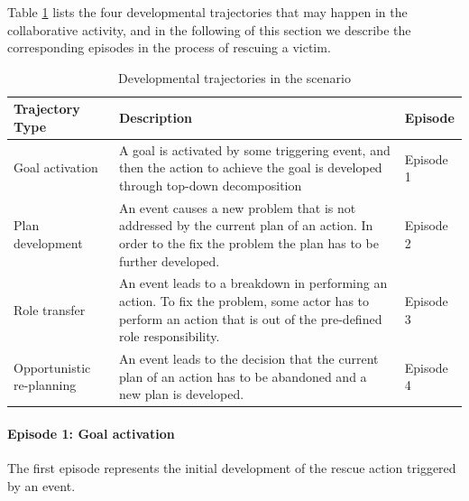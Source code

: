 Table \ref{tab:development_trajectories} lists the four developmental trajectories that may happen in the collaborative activity, and in the following of this section we describe the corresponding episodes in the process of rescuing a victim. 

\begin{table}[htbp]
\centering
\footnotesize
\begin{tabular}{>{\raggedright}p{1.4in}>{\raggedright}p{2.5in}>{\raggedright}p{1in}}

\toprule 
\textbf{Trajectory Type} & \textbf{Description} & \textbf{Episode}\tabularnewline
\midrule 
Goal activation & A goal is activated by some triggering event, and then the action
to achieve the goal is developed through top-down decomposition & Episode 1\tabularnewline
\midrule 
Plan development & An event causes a new problem that is not addressed by the current
plan of an action. In order to the fix the problem the plan has to
be further developed. & Episode 2\tabularnewline
\midrule 
Role transfer & An event leads to a breakdown in performing an action. To fix the problem, some actor has to perform an action that is out of the pre-defined role responsibility. & Episode 3\tabularnewline
\midrule 
Opportunistic re-planning & An event leads to the decision that the current plan of an action
has to be abandoned and a new plan is developed. & Episode 4\tabularnewline
\bottomrule

\end{tabular}	
\caption{Developmental trajectories in the scenario}
\label{tab:development_trajectories}
\end{table}

\paragraph*{Episode 1: Goal activation} %
\label{par:episode_1_goal_activation}
The first episode represents the initial development of the rescue action triggered by an event.

